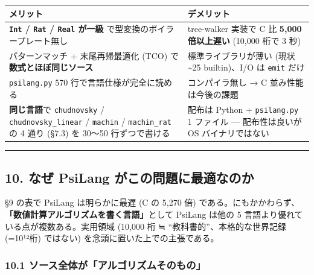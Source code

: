 \documentclass[
]{ltjsarticle}
\newcounter{none} %
\begin{document}
{\def\LTcaptype{none} %
\begin{longtable}[]{@{}
  >{\raggedright\arraybackslash}p{}
  >{\raggedright\arraybackslash}p{}@{}}
\toprule\noalign{}
\begin{minipage}[b]{\linewidth}\raggedright
メリット
\end{minipage} & \begin{minipage}[b]{\linewidth}\raggedright
デメリット
\end{minipage} \\
\midrule\noalign{}
\endhead
\bottomrule\noalign{}
\endlastfoot
\textbf{\texttt{Int} / \texttt{Rat} / \texttt{Real} が一級}
で型変換のボイラープレート無し & tree-walker 実装で C 比 \textbf{5,000
倍以上遅い} (10,000 桁で 3 秒) \\
パターンマッチ + 末尾再帰最適化 (TCO) で\textbf{数式とほぼ同じソース} &
標準ライブラリが薄い (現状 \textasciitilde25 builtin)、I/O は
\texttt{emit} だけ \\
\texttt{psilang.py} 570 行で言語仕様が完全に読める & コンパイラ無し → C
並み性能は今後の課題 \\
\textbf{同じ言語}で \texttt{chudnovsky} / \texttt{chudnovsky\_linear} /
\texttt{machin} / \texttt{machin\_rat} の 4 通り (§7.3) を 30〜50
行ずつで書ける & 配布は Python + \texttt{psilang.py} 1 ファイル ---
配布性は良いが OS バイナリではない \\
\end{longtable}
}

\begin{center}\rule{0.5\linewidth}{0.5pt}\end{center}

\subsection{10. なぜ PsiLang
がこの問題に最適なのか}\label{ux306aux305c-psilang-ux304cux3053ux306eux554fux984cux306bux6700ux9069ux306aux306eux304b}

§9 の表で PsiLang は明らかに最遅 (C の 5,270 倍)
である。にもかかわらず、\textbf{「数値計算アルゴリズムを書く言語」}として
PsiLang は他の 5 言語より優れている点が複数ある。実用領域 (10,000 桁 ≒
``教科書的''、本格的な世界記録 (=10¹²桁) ではない)
を念頭に置いた上での主張である。

\subsubsection{10.1
ソース全体が「アルゴリズムそのもの」}\label{ux30bdux30fcux30b9ux5168ux4f53ux304cux30a2ux30ebux30b4ux30eaux30baux30e0ux305dux306eux3082ux306e}
\end{document}
